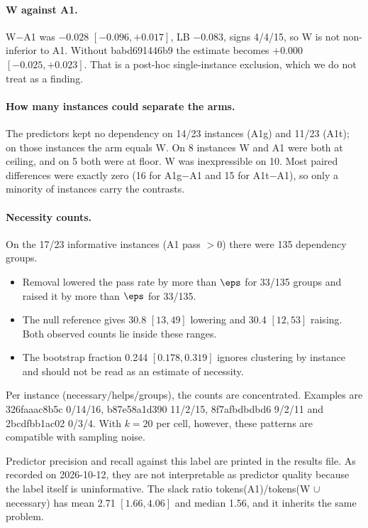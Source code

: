 \paragraph{W against A1.} W$-$A1 was $-0.028$ $[-0.096, +0.017]$, LB $-0.083$, signs 4/4/15, so W is not non-inferior to A1. Without babd691446b9 the estimate becomes $+0.000$ $[-0.025, +0.023]$. That is a post-hoc single-instance exclusion, which we do not treat as a finding.

\paragraph{How many instances could separate the arms.} The predictors kept no dependency on 14/23 instances (A1g) and 11/23 (A1t); on those instances the arm equals W. On 8 instances W and A1 were both at ceiling, and on 5 both were at floor. W was inexpressible on 10. Most paired differences were exactly zero (16 for A1g$-$A1 and 15 for A1t$-$A1), so only a minority of instances carry the contrasts.

\paragraph{Necessity counts.} On the 17/23 informative instances (A1 pass $> 0$) there were 135 dependency groups.
\begin{itemize}
\item Removal lowered the pass rate by more than $\eps$ for 33/135 groups and raised it by more than $\eps$ for 33/135.
\item The null reference gives 30.8 $[13, 49]$ lowering and 30.4 $[12, 53]$ raising. Both observed counts lie inside these ranges.
\item The bootstrap fraction 0.244 $[0.178, 0.319]$ ignores clustering by instance and should not be read as an estimate of necessity.
\end{itemize}

Per instance (necessary/helps/groups), the counts are concentrated. Examples are 326faaac8b5c 0/14/16, b87e58a1d390 11/2/15, 8f7afbdbdbd6 9/2/11 and 2bcdfbb1ac02 0/3/4. With $k=20$ per cell, however, these patterns are compatible with sampling noise.

Predictor precision and recall against this label are printed in the results file. As recorded on 2026-10-12, they are not interpretable as predictor quality because the label itself is uninformative. The slack ratio tokens(A1)/tokens(W $\cup$ necessary) has mean 2.71 $[1.66, 4.06]$ and median 1.56, and it inherits the same problem.

